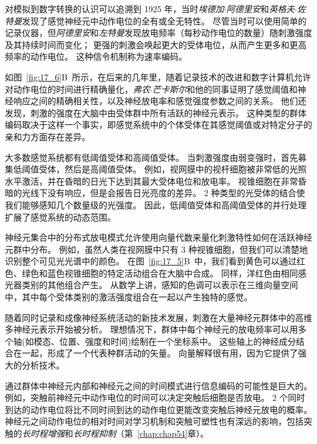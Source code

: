 对模拟到数字转换的认识可以追溯到 1925 年，当时\textit{埃德加$\cdot$阿德里安}和\textit{英格夫$\cdot$佐特曼}发现了感觉神经元中动作电位的全有或全无特性。 
尽管当时可以使用简单的记录仪器，但\textit{阿德里安}和\textit{左特曼}发现放电频率（每秒动作电位的数量）随刺激强度及其持续时间而变化； 
更强的刺激会唤起更大的受体电位，从而产生更多和更高频率的动作电位。 
这种信令机制称为速率编码。


如图~\ref{fig:17_6}B~所示，在后来的几年里，随着记录技术的改进和数字计算机允许对动作电位的时间进行精确量化，\textit{弗农$\cdot$芒卡斯尔}和他的同事证明了感觉阈值和神经响应之间的精确相关性，以及神经放电率和感觉强度参数之间的关系\cite{mountcastle1966neural}。
他们还发现，刺激的强度在大脑中由受体群中所有活跃的神经元表示。
这种类型的群体编码取决于这样一个事实，即感觉系统中的个体受体在其感觉阈值或对特定分子的亲和力方面存在差异。


大多数感觉系统都有低阈值受体和高阈值受体。
当刺激强度由弱变强时，首先募集低阈值受体，然后是高阈值受体。 
例如，视网膜中的视杆细胞被非常低的光照水平激活，并在昏暗的日光下达到其最大受体电位和放电率。
视锥细胞在非常昏暗的光线下没有响应，但是会报告日光亮度的差异。 
2 种类型的光受体的结合使我们能够感知几个数量级的光强度。
因此，低阈值受体和高阈值受体的并行处理扩展了感觉系统的动态范围。


神经元集合中的分布式放电模式允许使用向量代数来量化刺激特性如何在活跃神经元群中分布。
例如，虽然人类在视网膜中只有 3 种视锥细胞，但我们可以清楚地识别整个可见光光谱中的颜色。
在图~\ref{fig:17_5}B~中，我们看到黄色可以通过红色、绿色和蓝色视锥细胞的特定活动组合在大脑中合成。
同样，洋红色由相同感光器类别的其他组合产生。
从数学上讲，感知的色调可以表示在三维向量空间中，其中每个受体类别的激活强度组合在一起以产生独特的感觉。


随着同时记录和成像神经系统活动的新技术发展，刺激在大量神经元群体中的高维多神经元表示开始被分析。
理想情况下，群体中每个神经元的放电频率可以用多个轴(如模态、位置、强度和时间)绘制在一个坐标系中。
这些轴上的神经成分结合在一起，形成了一个代表种群活动的矢量。
向量解释很有用，因为它提供了强大的分析技术。


通过群体中神经元内部和神经元之间的时间模式进行信息编码的可能性是巨大的。
例如，突触前神经元中动作电位的时间可以决定突触后细胞是否放电。
2 个同时到达的动作电位将比不同时间到达的动作电位更能改变突触后神经元放电的概率。
神经元之间动作电位的相对时间对学习机制和突触可塑性也有深远的影响，包括突触的\textit{长时程增强}和\textit{长时程抑制}（第~\ref{chap:chap54}章）。



